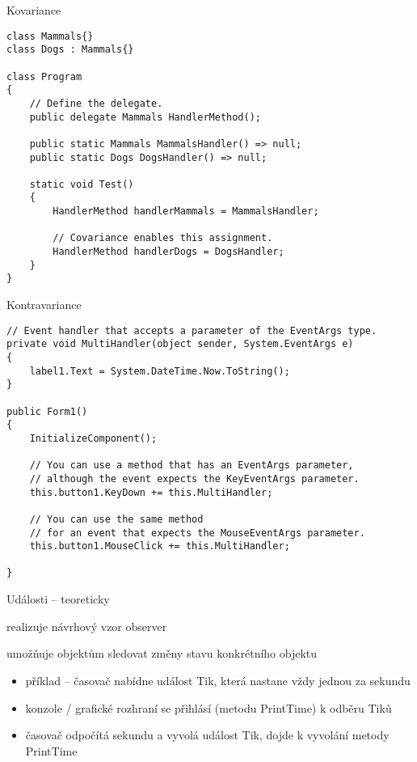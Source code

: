 \begin{frame}[fragile]
\vfill
\begin{exampleblock}{Kovariance}
\begin{lstlisting}
class Mammals{}  
class Dogs : Mammals{}  

class Program  
{  
    // Define the delegate.  
    public delegate Mammals HandlerMethod();  

    public static Mammals MammalsHandler() => null;
    public static Dogs DogsHandler() => null;

    static void Test()  
    {  
        HandlerMethod handlerMammals = MammalsHandler;  

        // Covariance enables this assignment.  
        HandlerMethod handlerDogs = DogsHandler;  
    }  
}  
\end{lstlisting}
\end{exampleblock}
\vfill
\end{frame}


\begin{frame}[fragile]
\vfill
\begin{exampleblock}{Kontravariance}
\begin{lstlisting}
// Event handler that accepts a parameter of the EventArgs type.  
private void MultiHandler(object sender, System.EventArgs e)  
{  
    label1.Text = System.DateTime.Now.ToString();  
}  

public Form1()  
{  
    InitializeComponent();  

    // You can use a method that has an EventArgs parameter,  
    // although the event expects the KeyEventArgs parameter.  
    this.button1.KeyDown += this.MultiHandler;  

    // You can use the same method   
    // for an event that expects the MouseEventArgs parameter.  
    this.button1.MouseClick += this.MultiHandler;  

}  
\end{lstlisting}
\end{exampleblock}
\vfill
\end{frame}


\zkouskove


\begin{frame}[fragile]
\begin{bitemize}{Události -- teoreticky}
\item realizuje návrhový vzor observer
\item umožňuje objektům sledovat změny stavu konkrétního objektu
\begin{itemize}
\item příklad -- časovač nabídne událost Tik, která nastane vždy jednou za sekundu
\item konzole / grafické rozhraní se přihlásí (metodu PrintTime) k odběru Tiků
\item časovač odpočítá sekundu a vyvolá událost Tik, dojde k vyvolání metody PrintTime
\end{itemize}

\end{bitemize}
\end{frame}



